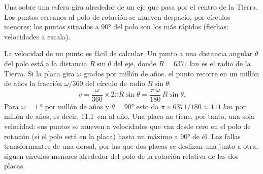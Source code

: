 \begin{omfigure}

{\small Una  sobre una esfera gira alrededor de un eje que pasa por
el centro de la Tierra. Los puntos cercanos al polo de rotación se mueven
despacio, por círculos menores; los puntos situados a \ang{90} del polo son los
más rápidos (flechas: velocidades a escala).}
\end{omfigure}

La velocidad de un punto es fácil de calcular. Un punto a una distancia
angular $\theta$ del polo está a la distancia $R\sin\theta$ del eje, donde
$R = \qty{6371}{km}$ es el radio de la Tierra. Si la placa gira $\omega$
grados por millón de años, el punto recorre en un millón de años la fracción
$\omega/360$ del círculo de radio $R\sin\theta$:
\[
  v = \frac{\omega}{360} \times 2\pi R\sin\theta
    = \frac{\pi\,\omega}{180}\,R\sin\theta .
\]
Para $\omega = \qty{1}{\degree}$ por millón de años y $\theta = \ang{90}$
esto da $\pi \times 6371/180 \approx \qty{111}{km}$ por millón de años, es
decir, \qty{11.1}{cm} al año. Una placa no tiene, por tanto, una sola
velocidad: sus puntos se mueven a velocidades que van desde cero en el polo de
rotación (si el polo está en la placa) hasta un máximo a \ang{90} de él. Las
fallas transformantes de una dorsal, por las que dos placas se deslizan una
junto a otra, siguen círculos menores alrededor del polo de la rotación
relativa de las dos placas.


